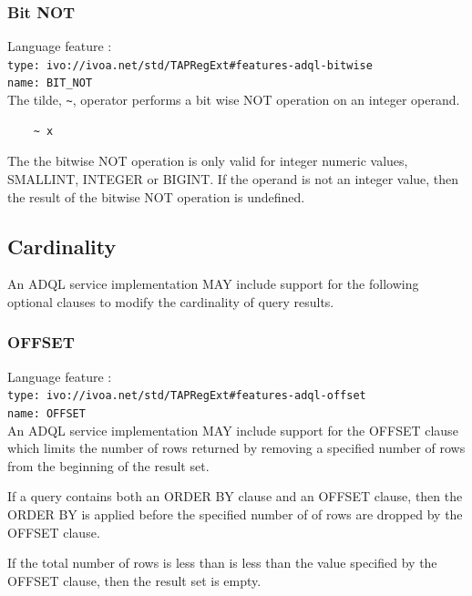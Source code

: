 \documentclass[11pt,a4paper]{ivoa}
\begin{document}
\subsubsection{Bit NOT}
\label{sec:bitwise.not}
{\footnotesize Language feature :}\\
{\footnotesize \verb|type: ivo://ivoa.net/std/TAPRegExt#features-adql-bitwise|}\\
{\footnotesize \verb|name: BIT_NOT|}\\

The tilde, \verb:~:, operator performs a bit wise NOT operation on an integer operand.

\begin{verbatim}
    ~ x
\end{verbatim}

The the bitwise NOT operation is only valid for integer numeric values, 
SMALLINT, INTEGER or BIGINT.
If the operand is not an integer value, then the result of the bitwise
NOT operation is undefined.

\subsection{Cardinality}
\label{sec:cardinality}

An ADQL service implementation MAY include support for the following optional
clauses to modify the cardinality of query results.

\subsubsection{OFFSET}
\label{sec:offset}

{\footnotesize Language feature :}\\
{\footnotesize \verb|type: ivo://ivoa.net/std/TAPRegExt#features-adql-offset|}\\
{\footnotesize \verb|name: OFFSET|}\\

An ADQL service implementation MAY include support for the OFFSET clause
which limits the number of rows returned by removing a specified number
of rows from the beginning of the result set.

If a query contains both an ORDER BY clause and an OFFSET clause,
then the ORDER BY is applied before the specified number of 
of rows are dropped by the OFFSET clause.

If the total number of rows is less than is less than the value
specified by the OFFSET clause, then the result set is empty.
\end{document}

